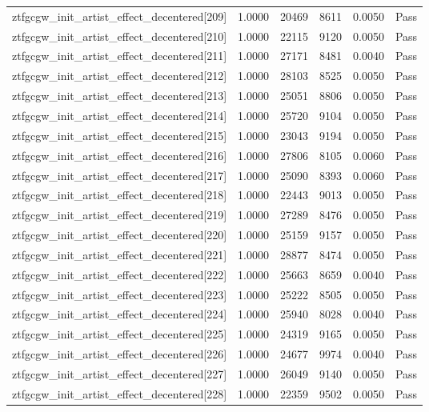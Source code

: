 \begin{table}[htbp]
\begin{tabular}{llrrll}
ztfgcgw\_init\_artist\_effect\_decentered[209] & 1.0000 & 20469 & 8611 & 0.0050 & Pass \\
ztfgcgw\_init\_artist\_effect\_decentered[210] & 1.0000 & 22115 & 9120 & 0.0050 & Pass \\
ztfgcgw\_init\_artist\_effect\_decentered[211] & 1.0000 & 27171 & 8481 & 0.0040 & Pass \\
ztfgcgw\_init\_artist\_effect\_decentered[212] & 1.0000 & 28103 & 8525 & 0.0050 & Pass \\
ztfgcgw\_init\_artist\_effect\_decentered[213] & 1.0000 & 25051 & 8806 & 0.0050 & Pass \\
ztfgcgw\_init\_artist\_effect\_decentered[214] & 1.0000 & 25720 & 9104 & 0.0050 & Pass \\
ztfgcgw\_init\_artist\_effect\_decentered[215] & 1.0000 & 23043 & 9194 & 0.0050 & Pass \\
ztfgcgw\_init\_artist\_effect\_decentered[216] & 1.0000 & 27806 & 8105 & 0.0060 & Pass \\
ztfgcgw\_init\_artist\_effect\_decentered[217] & 1.0000 & 25090 & 8393 & 0.0060 & Pass \\
ztfgcgw\_init\_artist\_effect\_decentered[218] & 1.0000 & 22443 & 9013 & 0.0050 & Pass \\
ztfgcgw\_init\_artist\_effect\_decentered[219] & 1.0000 & 27289 & 8476 & 0.0050 & Pass \\
ztfgcgw\_init\_artist\_effect\_decentered[220] & 1.0000 & 25159 & 9157 & 0.0050 & Pass \\
ztfgcgw\_init\_artist\_effect\_decentered[221] & 1.0000 & 28877 & 8474 & 0.0050 & Pass \\
ztfgcgw\_init\_artist\_effect\_decentered[222] & 1.0000 & 25663 & 8659 & 0.0040 & Pass \\
ztfgcgw\_init\_artist\_effect\_decentered[223] & 1.0000 & 25222 & 8505 & 0.0050 & Pass \\
ztfgcgw\_init\_artist\_effect\_decentered[224] & 1.0000 & 25940 & 8028 & 0.0040 & Pass \\
ztfgcgw\_init\_artist\_effect\_decentered[225] & 1.0000 & 24319 & 9165 & 0.0050 & Pass \\
ztfgcgw\_init\_artist\_effect\_decentered[226] & 1.0000 & 24677 & 9974 & 0.0040 & Pass \\
ztfgcgw\_init\_artist\_effect\_decentered[227] & 1.0000 & 26049 & 9140 & 0.0050 & Pass \\
ztfgcgw\_init\_artist\_effect\_decentered[228] & 1.0000 & 22359 & 9502 & 0.0050 & Pass \\

\end{tabular}
\end{table}
